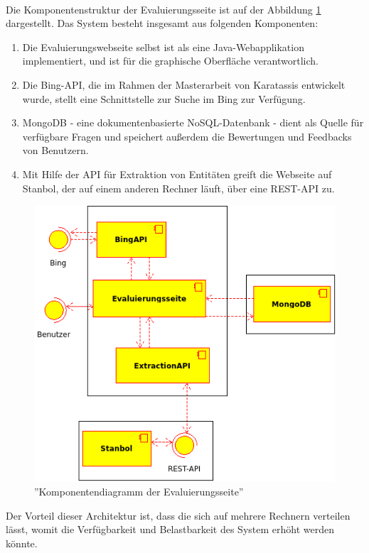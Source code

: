 \paragraph{}
Die Komponentenstruktur der Evaluierungsseite ist auf der Abbildung \ref{fig:evalcomponents} dargestellt. Das System besteht insgesamt aus folgenden Komponenten:
\begin{enumerate}
\item Die Evaluierungswebseite selbst ist als eine Java-Webapplikation implementiert, und ist für die graphische Oberfläche verantwortlich.
\item Die Bing-API, die im Rahmen der Masterarbeit von Karatassis\cite{Karatassis:15} entwickelt wurde, stellt eine Schnittstelle zur Suche im Bing zur Verfügung.
\item MongoDB - eine dokumentenbasierte NoSQL-Datenbank - dient als Quelle für verfügbare Fragen und speichert außerdem die Bewertungen und Feedbacks von Benutzern.
\item Mit Hilfe der API für Extraktion von Entitäten greift die Webseite auf Stanbol, der auf einem anderen Rechner läuft, über eine REST-API zu. 
\end{enumerate}

\begin{figure}
\centering
\includegraphics[width=1\textwidth]{Bilder/evaluation_components.png}
\caption{''Komponentendiagramm der Evaluierungsseite''}
\label{fig:evalcomponents}
\end{figure}
Der Vorteil dieser Architektur ist, dass die sich auf mehrere Rechnern verteilen lässt, womit die Verfügbarkeit und Belastbarkeit des System erhöht werden könnte.

